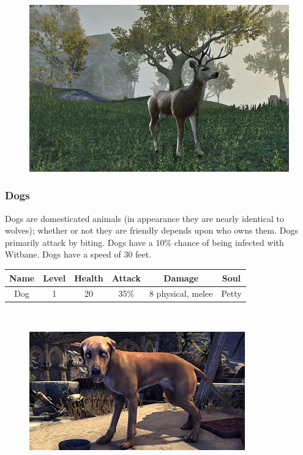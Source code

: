 \documentclass[12pt]{book}
\begin{document}
\begin{figure}[h]
	\centering
	\includegraphics[scale=0.75]{deer.png}
\end{figure}

\subsubsection{Dogs}
Dogs are domesticated animals (in appearance they are nearly identical to wolves); whether or not they are friendly depends upon who owns them. Dogs primarily attack by biting. Dogs have a 10\% chance of being infected with Witbane. Dogs have a speed of 30 feet.

\begin{tabular}{|c|c|c|c|c|c|}
\hline
Name & Level & Health & Attack & Damage & Soul\\ \hline
Dog & 1 & 20 & 35\% & 8 physical, melee & Petty\\ \hline
\end{tabular}\\

\begin{figure}[h]
	\centering
	\includegraphics[scale=1]{dog.png}
\end{figure}
\end{document}
